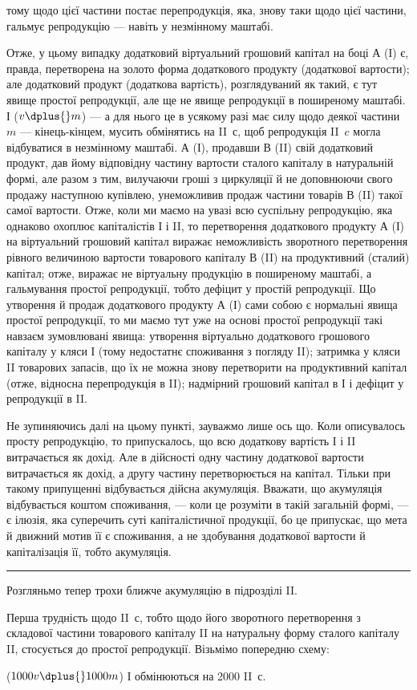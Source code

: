 \parcont{}  %
тому щодо цієї частини постає перепродукція, яка, знову таки щодо цієї
частини, гальмує репродукцію — навіть у незмінному маштабі.

Отже, у цьому випадку додатковий віртуальний грошовий капітал на
боці $А$ (І) є, правда, перетворена на золото форма додаткового продукту
(додаткової вартости); але додатковий продукт (додаткова вартість), розглядуваний
як такий, є тут явище простої репродукції, але ще не явище
репродукції в поширеному маштабі. І ($v \dplus{} m$) — а для нього це в усякому
разі має силу щодо деякої частини $m$ — кінець-кінцем, мусить обмінятись
на II~$с$, щоб репродукція II~$c$ могла відбуватися в незмінному маштабі.
$А$ (І), продавши $В$ (II) свій додатковий продукт, дав йому відповідну
частину вартости сталого капіталу в натуральній формі, але разом з тим,
вилучаючи гроші з циркуляції й не доповнюючи свого продажу наступною
купівлею, унеможливив продаж частини товарів $В$ (II) такої самої
вартости. Отже, коли ми маємо на увазі всю суспільну репродукцію, яка
однаково охоплює капіталістів І і II, то перетворення додаткового продукту
$А$ (І) на віртуальний грошовий капітал виражає неможливість зворотного
перетворення рівного величиною вартости товарового капіталу
$В$ (II) на продуктивний (сталий) капітал; отже, виражає не віртуальну
продукцію в поширеному маштабі, а гальмування простої репродукції,
тобто дефіцит у простій репродукції. Що утворення й продаж додаткового
продукту $А$ (І) сами собою є нормальні явища простої репродукції,
то ми маємо тут уже на основі простої репродукції такі навзаєм зумовлювані
явища: утворення віртуально додаткового грошового капіталу у
кляси І (тому недостатнє споживання з погляду II); затримка у кляси II
товарових запасів, що їх не можна знову перетворити на продуктивний
капітал (отже, відносна перепродукція в II); надмірний грошовий капітал
в І і дефіцит у репродукції в II.

Не зупиняючись далі на цьому пункті, зауважмо лише ось що.
Коли описувалось просту репродукцію, то припускалось, що всю додаткову
вартість І і II витрачається як дохід. Але в дійсності одну частину
додаткової вартости витрачається як дохід, а другу частину перетворюється
на капітал. Тільки при такому припущенні відбувається дійсна
акумуляція. Вважати, що акумуляція відбувається коштом споживання, —
коли це розуміти в такій загальній формі, — є ілюзія, яка суперечить суті
капіталістичної продукції, бо це припускає, що мета й движний мотив
її є споживання, а не здобування додаткової вартости й капіталізація її,
тобто акумуляція.

\pfbreak

Розгляньмо тепер трохи ближче акумуляцію в підрозділі II.

Перша трудність щодо II~$с$, тобто щодо його зворотного перетворення
з складової частини товарового капіталу II на натуральну форму
сталого капіталу II, стосується до простої репродукції. Візьмімо попередню
схему:
\begin{center}
  ($1000 v \dplus{} 1000 m$) І обмінюються на
  2000 II~$с$.
\end{center}
